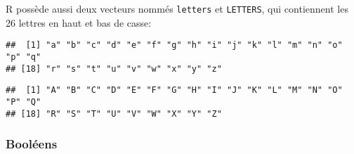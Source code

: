 R possède aussi deux vecteurs nommés \texttt{letters} et \texttt{LETTERS}, qui contiennent les 26 lettres en haut et bas de casse:

\begin{knitrout}
\color{fgcolor}\begin{kframe}
\begin{flushleft}
\ttfamily\noindent
{}\mbox{}
\normalfont
\end{flushleft}
\begin{verbatim}
##  [1] "a" "b" "c" "d" "e" "f" "g" "h" "i" "j" "k" "l" "m" "n" "o" "p" "q"
## [18] "r" "s" "t" "u" "v" "w" "x" "y" "z"
\end{verbatim}
\begin{flushleft}
\ttfamily\noindent
{}\mbox{}
\normalfont
\end{flushleft}
\begin{verbatim}
##  [1] "A" "B" "C" "D" "E" "F" "G" "H" "I" "J" "K" "L" "M" "N" "O" "P" "Q"
## [18] "R" "S" "T" "U" "V" "W" "X" "Y" "Z"
\end{verbatim}
\end{kframe}
\end{knitrout}


\subsubsection{Booléens}

